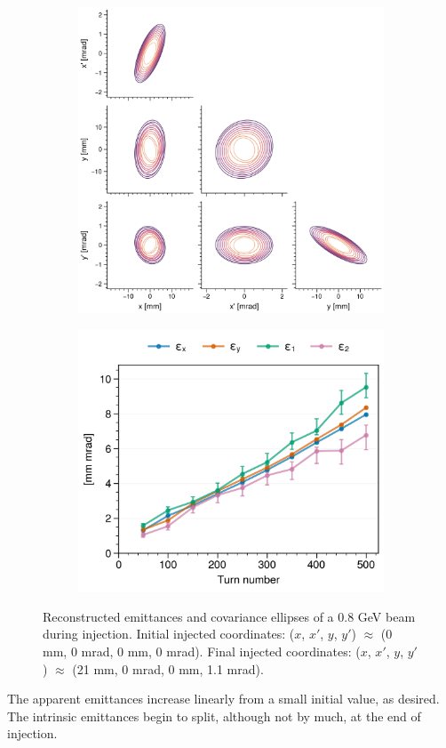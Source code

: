 %
%
\begin{figure}[!p]
    \centering
    \begin{subfigure}{0.6\textwidth}
        \includegraphics[width=\textwidth]{Images/chapter5/exp2/corner.png}
    \end{subfigure}
    \hfill
    \begin{subfigure}[t]{0.39\textwidth}
        \includegraphics[width=\textwidth]{Images/chapter5/exp2/emittances.png}
    \end{subfigure}
    \caption{Reconstructed emittances and covariance ellipses of a 0.8 GeV beam during injection. Initial injected coordinates: ($x$, $x'$, $y$, $y'$) $\approx$ (0 mm, 0 mrad, 0 mm, 0 mrad). Final injected coordinates: ($x$, $x'$, $y$, $y'$) $\approx$ (21 mm, 0 mrad, 0 mm, 1.1 mrad).}
    \label{fig:exp2_emittances}
\end{figure}
%
The apparent emittances increase linearly from a small initial value, as desired. The intrinsic emittances begin to split, although not by much, at the end of injection.

